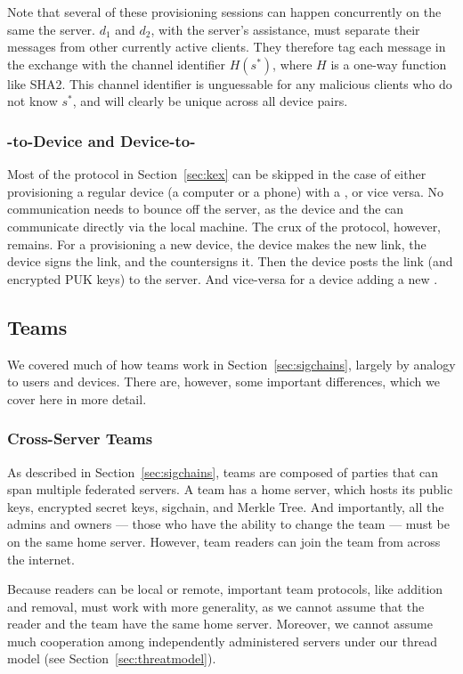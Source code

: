 Note that several of these provisioning sessions can happen concurrently on the
same the server. $d_1$ and $d_2$, with the server's assistance, must separate
their messages from other currently active clients.  They therefore tag each
message in the exchange with the channel identifier $H(s^{*})$, where $H$ is a
one-way function like SHA2. This channel identifier is unguessable for 
any malicious clients who do not know $s^{*}$, and will clearly be unique
across all device pairs.

\subsubsection{\Yubi -to-Device and Device-to-\Yubi }

Most of the protocol in Section~\ref{sec:kex} can be skipped in the case
of either provisioning a regular device (a computer or a phone) with a \yubi ,
or vice versa. No communication needs to bounce off the server, as the device
and the \yubi{} can communicate directly via the local machine. The crux of 
the protocol, however, remains. For a \yubi{} provisioning a new device,
the device makes the new link, the device signs the link, and the \yubi{} 
countersigns it. Then the device posts the link (and encrypted PUK keys)
to the server. And vice-versa for a device adding a new \yubi . 

\subsection{Teams}
\label{sec:teams}

We covered much of how teams work in Section~\ref{sec:sigchains}, largely by
analogy to users and devices. There are, however, some important differences,
which we cover here in more detail.

\subsubsection{Cross-Server Teams}

As described in Section~\ref{sec:sigchains}, teams are composed of parties
that can span multiple federated servers. A team has a home server, which 
hosts its public keys, encrypted secret keys, sigchain, and Merkle Tree.
And importantly, all the admins and owners --- those who have the ability
to change the team --- must be on the same home server. However, team readers
can join the team from across the internet.

Because readers can be local or remote, important team protocols, like addition
and removal, must work with more generality, as we cannot assume that the reader
and the team have the same home server. Moreover, we cannot assume much
cooperation among independently administered servers under our thread model
(see Section~\ref{sec:threatmodel}).

